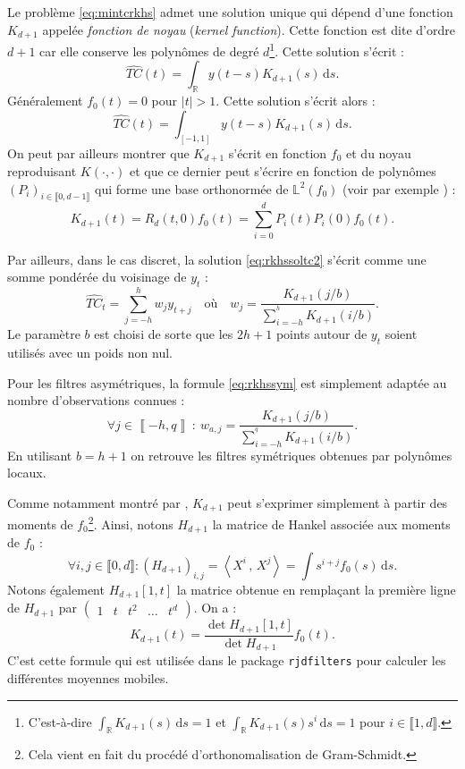 \documentclass[
  11pt,
  french,
  a4paper]{article}
\newcommand\R{\mathds{R}}
\newcommand\1{\mathds{1}}
\newcommand\ud{\,\mathrm{d}}
\newcommand{\ps}[2]{\left\langle #1 \,,\, #2 \right\rangle}
\begin{document}
Le problème \eqref{eq:mintcrkhs} admet une solution unique qui dépend d'une fonction \(K_{d+1}\) appelée \emph{fonction de noyau} (\emph{kernel function}).
Cette fonction est dite d'ordre \(d+1\) car elle conserve les polynômes de degré \(d\)\footnote{
  C'est-à-dire \(\int_\R K_{d+1}(s)\ud s = 1\) et \(\int_\R K_{d+1}(s) s^i\ud s = 1\) pour \(i\in \llbracket 1, d\rrbracket\).}.
Cette solution s'écrit :
\begin{equation}
\widehat{TC}(t)=\int_\R y(t-s)K_{d+1}(s) \ud s.
\label{eq:rkhssoltc}
\end{equation}
Généralement \(f_0(t) = 0\) pour \(\lvert t \rvert>1\).
Cette solution s'écrit alors :
\begin{equation}
\widehat{TC}(t)=\int_{[-1,1]} y(t-s)K_{d+1}(s) \ud s.
\label{eq:rkhssoltc2}
\end{equation}
On peut par ailleurs montrer que \(K_{d+1}\) s'écrit en fonction \(f_0\) et du noyau reproduisant \(K(\cdot,\cdot)\) et que ce dernier peut s'écrire en fonction de polynômes \((P_i)_{i\in \llbracket 0, d-1 \rrbracket}\) qui forme une base orthonormée de \(\mathbb L^2(f_0)\) (voir par exemple \textcite{berlinet1993}) :
\[
K_{d+1}(t) = R_d(t,0)f_0(t) = \sum_{i=0}^dP_i(t)P_i(0)f_0(t).
\]

Par ailleurs, dans le cas discret, la solution \eqref{eq:rkhssoltc2} s'écrit comme une somme pondérée du voisinage de \(y_t\) :
\begin{equation}
\widehat{TC}_t=\sum_{j=-h}^h w_j y_{t+j}\quad
\text{où} \quad
w_j=\frac{K_{d+1}(j/b)}{\sum_{i=-h}^{^h}K_{d+1}(i/b)}.
\label{eq:rkhssym}
\end{equation}
Le paramètre \(b\) est choisi de sorte que les \(2h+1\) points autour de \(y_t\) soient utilisés avec un poids non nul.

Pour les filtres asymétriques, la formule \eqref{eq:rkhssym} est simplement adaptée au nombre d'observations connues :
\begin{equation}
\forall j\in\left\llbracket -h,q\right\rrbracket\::\: w_{a,j}=\frac{K_{d+1}(j/b)}{\sum_{i=-h}^{^q}K_{d+1}(i/b)}.
\label{eq:rkhsasym}
\end{equation}
En utilisant \(b=h+1\) on retrouve les filtres symétriques obtenues par polynômes locaux.

Comme notamment montré par \textcite{dagumbianconcini2016seasonal}, \(K_{d+1}\) peut s'exprimer simplement à partir des moments de \(f_0\)\footnote{
  Cela vient en fait du procédé d'orthonomalisation de Gram-Schmidt.}.
Ainsi, notons \(H_{d+1}\) la matrice de Hankel associée aux moments de \(f_0\) :
\[
\forall i,j\in \llbracket 0, d\rrbracket:
\left(H_{d+1}\right)_{i,j}=\ps{X^i}{X^j}=\int s^{i+j}f_0(s)\ud s.
\]
Notons également \(H_{d+1}[1,t]\) la matrice obtenue en remplaçant la première ligne de \(H_{d+1}\) par \(\begin{pmatrix} 1 & t & t^2 & \dots & t^d\end{pmatrix}\).
On a :
\begin{equation}
K_{d+1}(t)=\frac{\det{H_{d+1}[1,t]}}{\det{H_{d+1}}}f_0(t).
\label{eq:rkhskernelfun}
\end{equation}
C'est cette formule qui est utilisée dans le package \texttt{rjdfilters} pour calculer les différentes moyennes mobiles.
\end{document}
